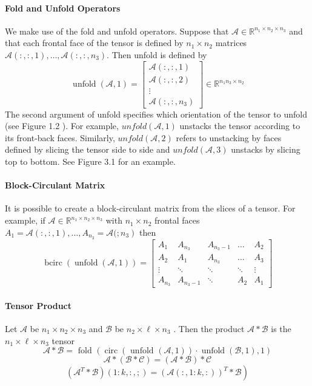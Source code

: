 \documentclass[english]{article}
\newcommand{\<}{\langle}
\renewcommand{\>}{\rangle}
\theoremstyle{definition}
\begin{document}
\paragraph{Fold and Unfold Operators} We make use of the fold and unfold operators. Suppose that  $\mathcal{A} \in \mathbb{R}^{n_{1} \times n_{2} \times n_{3}}$ and that each frontal face of the tensor is defined by  $n_{1} \times n_{2}$  matrices  $\mathcal{A}(:,:, 1), \ldots,   \mathcal{A}\left(:,:, n_{3}\right)$.  Then unfold is defined by
\begin{equation*}
\operatorname{unfold}(\mathcal{A}, 1)=\left[\begin{array}{c}
\mathcal{A}(:,:, 1) \\
\mathcal{A}(:,:, 2) \\
\vdots \\
\mathcal{A}\left(:,:, n_{3}\right)
\end{array}\right] \in \mathbb{R}^{n_{1} n_{3} \times n_{2}}
\end{equation*}
The second argument of unfold specifies which orientation of the tensor to unfold (see Figure 1.2 ). For example, $unfold  (\mathcal{A}, 1)$  unstacks the tensor according to its front-back faces. Similarly, $unfold(  \mathcal{A}, 2  )$ refers to unstacking by faces defined by slicing the tensor side to side and $unfold  (\mathcal{A}, 3)$  unstacks by slicing top to bottom. See Figure 3.1 for an example.
\paragraph{Block-Circulant Matrix} It is possible to create a block-circulant matrix from the slices of a tensor. For example, if  $\mathcal{A} \in \mathbb{R}^{n_{1} \times n_{2} \times n_{3}}$  with  $n_{1} \times n_{2}$  frontal faces  $A_{1}=\mathcal{A}(:,:, 1), \ldots, A_{n_{3}}=\mathcal{A}( 
\left.; n_{3}\right)$  then
\begin{equation*}
\operatorname{bcirc}(\operatorname{unfold}(\mathcal{A}, 1))=\left[\begin{array}{ccccc}
A_{1} & A_{n_{3}} & A_{n_{3}-1} & \dots & A_{2} \\
A_{2} & A_{1} & A_{n_{3}} & \dots & A_{3} \\
\vdots & \ddots & \ddots & \ddots & \vdots \\
A_{n_{3}} & A_{n_{3}-1} & \ddots & A_{2} & A_{1}
\end{array}\right]
\end{equation*}
\paragraph{Tensor Product} Let  $\mathcal{A}$  be  $n_{1} \times n_{2} \times n_{3}$  and  $\mathcal{B}$  be  $n_{2} \times \ell \times n_{3}$ .  Then the product
$\mathcal{A} * \mathcal{B}$  is the  $n_{1} \times \ell \times n_{3}$  tensor
$$\mathcal{A} * \mathcal{B}=\text { fold }(\operatorname{circ}(\text { unfold }(\mathcal{A}, 1)) \cdot \operatorname{unfold}(\mathcal{B}, 1), 1)$$
  $$\mathcal{A} *(\mathcal{B} * \mathcal{C})=(\mathcal{A} * \mathcal{B}) * \mathcal{C}$$
$$\left.\left(\mathcal{A}^{T} * \mathcal{B}\right)(1: k,:, ;)=(\mathcal{A}(:, 1: k,:))^{T} * \mathcal{B}\right)$$
\end{document}

